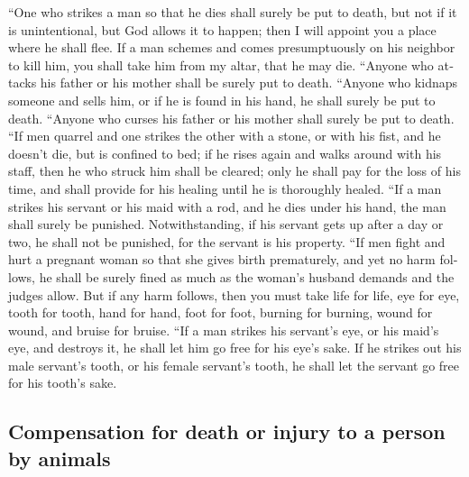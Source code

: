\begin{paracol}{2}
\begin{otherlanguage}{english}
 ``One who strikes a man so that he dies shall surely be
put to death,  but not if it is unintentional, but God
allows it to happen; then I will appoint you a place where he shall
flee.  If a man schemes and comes presumptuously on his
neighbor to kill him, you shall take him from my altar, that he may die.
 ``Anyone who attacks his father or his mother shall be
surely put to death.  ``Anyone who kidnaps someone and
sells him, or if he is found in his hand, he shall surely be put to
death.  ``Anyone who curses his father or his mother
shall surely be put to death.  ``If men quarrel and one
strikes the other with a stone, or with his fist, and he doesn't die,
but is confined to bed;  if he rises again and walks
around with his staff, then he who struck him shall be cleared; only he
shall pay for the loss of his time, and shall provide for his healing
until he is thoroughly healed.  ``If a man strikes his
servant or his maid with a rod, and he dies under his hand, the man
shall surely be punished.  Notwithstanding, if his
servant gets up after a day or two, he shall not be punished, for the
servant is his property.  ``If men fight and hurt a
pregnant woman so that she gives birth prematurely, and yet no harm
follows, he shall be surely fined as much as the woman's husband demands
and the judges allow.  But if any harm follows, then you
must take life for life,  eye for eye, tooth for tooth,
hand for hand, foot for foot,  burning for burning, wound
for wound, and bruise for bruise.  ``If a man strikes his
servant's eye, or his maid's eye, and destroys it, he shall let him go
free for his eye's sake.  If he strikes out his male
servant's tooth, or his female servant's tooth, he shall let the servant
go free for his tooth's sake.

\hypertarget{compensation-for-death-or-injury-to-a-person-by-animals}{%
\subsection{Compensation for death or injury to a person by
animals}\label{compensation-for-death-or-injury-to-a-person-by-animals}}


\end{otherlanguage}
\end{paracol}
